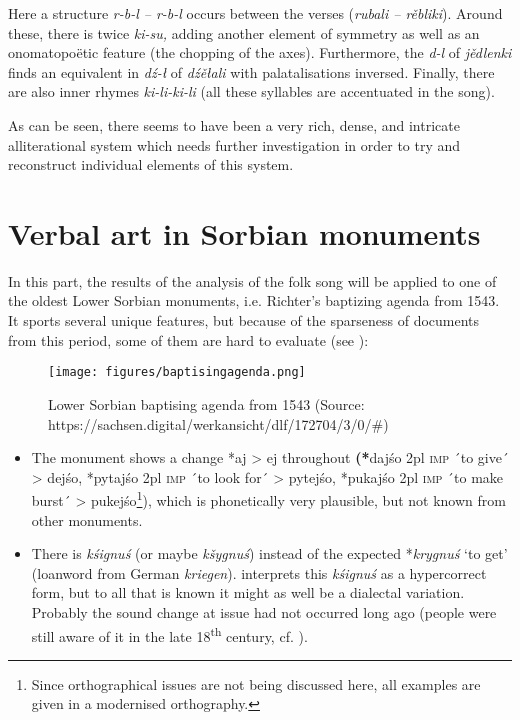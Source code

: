 \documentclass[output=paper,hidelinks]{langscibook}
\begin{document}
\hspace*{-4pt}Here a structure \textit{r-b-l – r-b-l} occurs between the verses (\textit{rubali – rěbliki}). Around these, there is twice \textit{ki-su,} adding another element of symmetry as well as an onomatopoëtic feature (the chopping of the axes). Furthermore, the \textit{d-l} of \textit{jědlenki} finds an equivalent in \textit{dź-ł} of \textit{dźěłali} with palatalisations inversed. Finally, there are also inner rhymes \textit{ki-li-ki-li} (all these syllables are accentuated in the song).
 

 
As can be seen, there seems to have been a very rich, dense, and intricate alliterational system which needs further investigation in order to try and reconstruct individual elements of this system.
 

\section{Verbal art in Sorbian monuments}
 
In this part, the results of the analysis of the folk song will be applied to one of the oldest Lower Sorbian monuments, i.e. Richter’s baptizing agenda from 1543. It sports several unique features, but because of the sparseness of documents from this period, some of them are hard to evaluate (see ):
 


\begin{figure}
\texttt{[image: figures/baptisingagenda.png]}
\caption{Lower Sorbian baptising agenda from 1543 (Source: https://sachsen.digital/werkansicht/dlf/172704/3/0/\#)}
\label{fig:werner:4}
\end{figure}
 

\begin{itemize}
\item The monument shows a change *aj > ej throughout \textbf{(*}dajśo 2pl \textsc{imp} ´to give´ > dejśo, *pytajśo 2pl \textsc{imp} ´to look for´ > pytejśo, *pukajśo 2pl \textsc{imp} ´to make burst´ > pukejśo\footnote{Since orthographical issues are not being discussed here, all examples are given in a modernised orthography.}), which is phonetically very plausible, but not known from other monuments.
\item There is \textit{kśignuś} (or maybe \textit{kšygnuś}) instead of the expected *\textit{krygnuś} ‘to get’ (loanword from German \textit{kriegen}). \citet[690]{Schuster1989} interprets this \textit{kśignuś} as a hypercorrect form, but to all that is known it might as well be a dialectal variation. Probably the sound change at issue had not occurred long ago (people were still aware of it in the late 18\textsuperscript{th} century, cf. \citealt[31]{Schlegel2019}).
\end{itemize}
 
\end{document}
